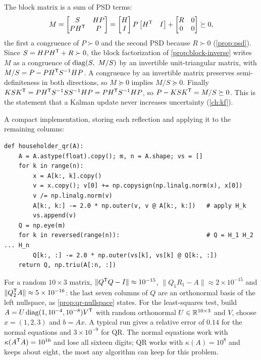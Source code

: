 \begin{solutions}
  \item The block matrix is a sum of PSD terms:
        \[
          M = \begin{bmatrix}S & HP\\ PH^{\mathsf{T}} & P\end{bmatrix}
            = \begin{bmatrix}H\\ I\end{bmatrix}P\begin{bmatrix}H^{\mathsf{T}} & I\end{bmatrix} + \begin{bmatrix}R & 0\\ 0 & 0\end{bmatrix} \succeq 0,
        \]
        the first a congruence of $P \succ 0$ and the second PSD because $R \succ 0$ (\cref{prop:psd}). Since $S = HPH^{\mathsf{T}} + R \succ 0$, the block
        factorization of \cref{prop:block-inverse} writes $M$ as a congruence of $\operatorname{diag}(S,\ M/S)$ by an invertible unit-triangular matrix, with
        $M/S = P - PH^{\mathsf{T}} S^{-1} HP$. A congruence by an invertible matrix preserves semi-definiteness in both directions, so $M \succeq 0$ implies
        $M/S \succeq 0$. Finally $KSK^{\mathsf{T}} = PH^{\mathsf{T}} S^{-1} SS^{-1} HP = PH^{\mathsf{T}} S^{-1} HP$, so $P - KSK^{\mathsf{T}} = M/S \succeq 0$. This is the statement that a Kalman
        update never increases uncertainty (\cref{ch:kf}).

  \item A compact implementation, storing each reflection and applying it to the remaining columns:
\begin{lstlisting}[style=py]
def householder_qr(A):
    A = A.astype(float).copy(); m, n = A.shape; vs = []
    for k in range(n):
        x = A[k:, k].copy()
        v = x.copy(); v[0] += np.copysign(np.linalg.norm(x), x[0])
        v /= np.linalg.norm(v)
        A[k:, k:] -= 2.0 * np.outer(v, v @ A[k:, k:])   # apply H_k
        vs.append(v)
    Q = np.eye(m)
    for k in reversed(range(n)):                        # Q = H_1 H_2 ... H_n
        Q[k:, :] -= 2.0 * np.outer(vs[k], vs[k] @ Q[k:, :])
    return Q, np.triu(A[:n, :])
\end{lstlisting}
        For a random $10\times3$ matrix, $\|Q^{\mathsf{T}} Q - I\| \approx 10^{-15}$, $\|Q_1R_1 - A\| \approx 2\times10^{-15}$ and $\|Q_2^{\mathsf{T}} A\| \approx 5\times10^{-16}$: the last
        seven columns of $Q$ are an orthonormal basis of the left nullspace, as \cref{prop:qr-nullspace} states. For the least-squares test, build
        $A = U\operatorname{diag}(1, 10^{-4}, 10^{-8})V^{\mathsf{T}}$ with random orthonormal $U \in \mathbb{R}^{10\times3}$ and $V$, choose $x = (1, 2, 3)$ and $b = Ax$. A typical run
        gives a relative error of $0.14$ for the normal equations and $3\times10^{-9}$ for QR. The normal equations work with
        $\kappa(A^{\mathsf{T}} A) = 10^{16}$ and lose all sixteen digits; QR works with $\kappa(A) = 10^8$ and keeps about eight, the most any algorithm can
        keep for this problem.


\end{solutions}
